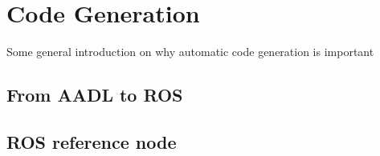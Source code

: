 \chapter{Code Generation}\label{ch:CodeGeneration}
Some general introduction on why automatic code generation is important

\section{From AADL to ROS}

\section{ROS reference node}

